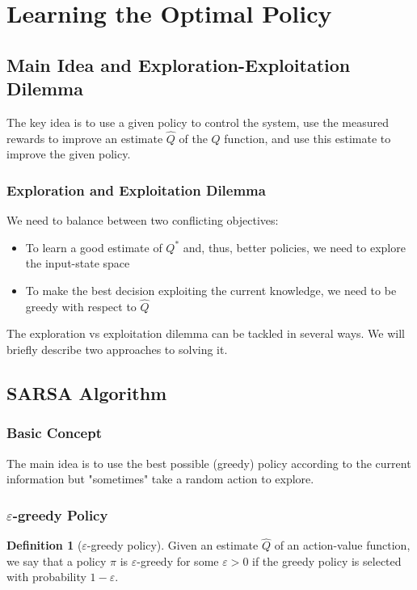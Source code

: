 \documentclass[openany]{book}
\theoremstyle{definition}
\newtheorem{definition}{Definition}[section]
\theoremstyle{remark}
\begin{document}
\pagebreak

\section{Learning the Optimal Policy}
\subsection{Main Idea and Exploration-Exploitation Dilemma}

The key idea is to use a given policy to control the system, use the measured rewards to improve an estimate $\hat{Q}$ of the $Q$ function, and use this estimate to improve the given policy.

\subsubsection{Exploration and Exploitation Dilemma}
We need to balance between two conflicting objectives:
\begin{itemize}
    \item To learn a good estimate of $Q^*$ and, thus, better policies, we need to explore the input-state space
    \item To make the best decision exploiting the current knowledge, we need to be greedy with respect to $\hat{Q}$
\end{itemize}

The exploration vs exploitation dilemma can be tackled in several ways. We will briefly describe two approaches to solving it.

\subsection{SARSA Algorithm}
\subsubsection{Basic Concept}
The main idea is to use the best possible (greedy) policy according to the current information but "sometimes" take a random action to explore.

\subsubsection{$\varepsilon$-greedy Policy}
\begin{definition}[$\varepsilon$-greedy policy]
Given an estimate $\hat{Q}$ of an action-value function, we say that a policy $\hat{\pi}$ is $\varepsilon$-greedy for some $\varepsilon > 0$ if the greedy policy is selected with probability $1-\varepsilon$.
\end{definition}
\end{document}
